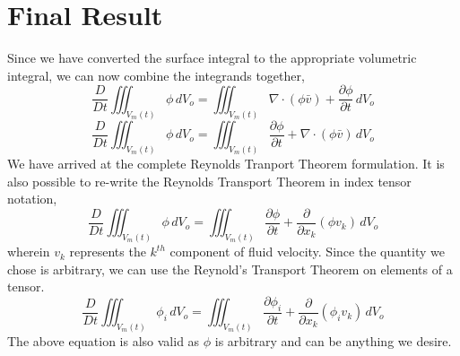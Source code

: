 \section{Final Result}
\begin{comment}
\end{comment}
Since we have converted the surface integral to the appropriate volumetric integral, we can now combine the integrands together,
$$\frac{D}{Dt}\iiint^{}_{V_{m}(t)} \phi \,dV_{o} = \iiint^{}_{V_{m}(t)}\nabla \cdot (\phi \bar{v}) + \frac{\partial \phi}{\partial t} \,dV_{o}$$
\begin{equation}
\frac{D}{Dt}\iiint^{}_{V_{m}(t)} \phi \,dV_{o} = \iiint^{}_{V_{m}(t)} \frac{\partial \phi}{\partial t} + \nabla \cdot (\phi \bar{v}) \,dV_{o}
\label{Reynolds Transport Theorem Vector Notation}
\end{equation}
We have arrived at the complete Reynolds Tranport Theorem formulation.
It is also possible to re-write the Reynolds Transport Theorem in index tensor notation,
\begin{equation}
\frac{D}{Dt}\iiint^{}_{V_{m}(t)} \phi \,dV_{o} = \iiint^{}_{V_{m}(t)} \frac{\partial \phi}{\partial t} + \frac{\partial}{\partial x_{k}} (\phi v_{k}) \,dV_{o}
\label{Reynolds Transport Theorem Tensor Index Notation}
\end{equation}
wherein $v_{k}$ represents the $k^{th}$ component of fluid velocity.
Since the quantity we chose is arbitrary, we can use the Reynold's Transport Theorem on elements of a tensor.
\begin{equation}
\frac{D}{Dt}\iiint^{}_{V_{m}(t)} \phi_{i} \,dV_{o} = \iiint^{}_{V_{m}(t)} \frac{\partial \phi_{i}}{\partial t} + \frac{\partial}{\partial x_{k}} (\phi_{i} v_{k}) \,dV_{o} 
\label{Reynolds Transport Theorem Tensor Index Notation Arbitrary Argument}
\end{equation}
The above equation is also valid as $\phi$ is arbitrary and can be anything we desire. 

